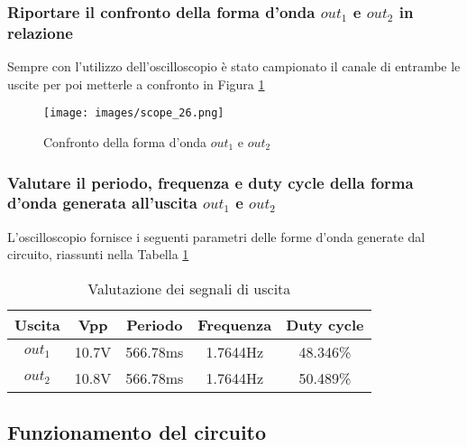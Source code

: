 \subsubsection*{Riportare il confronto della forma d’onda $out_1$ e $out_2$ in relazione}
Sempre con l'utilizzo dell'oscilloscopio è stato campionato il canale di entrambe le uscite per poi metterle a confronto in Figura \ref{fig:FacConfronto}
\begin{figure}[H]
    \centering
    \texttt{[image: images/scope\_26.png]}
    \caption{Confronto della forma d’onda $out_1$ e $out_2$}
    \label{fig:FacConfronto}
\end{figure}
\subsubsection*{Valutare il periodo, frequenza e duty cycle della forma d’onda generata all’uscita $out_1$ e $out_2$}
L'oscilloscopio fornisce i seguenti parametri delle forme d'onda generate dal circuito, riassunti nella Tabella \ref{tab:RisFac1}
\begin{table}[H]
    \centering
    \begin{tabular}{||c|c|c|c|c||}
        \hline\hline
        Uscita & Vpp & Periodo & Frequenza & Duty cycle \\\hline
        $out_1$ & 10.7V & 566.78ms & 1.7644Hz & 48.346\% \\\hline
        $out_2$ & 10.8V & 566.78ms & 1.7644Hz & 50.489\%\\\hline
    \end{tabular}
    \caption{Valutazione dei segnali di uscita}
    \label{tab:RisFac1}
\end{table}
\subsection{Funzionamento del circuito} 

